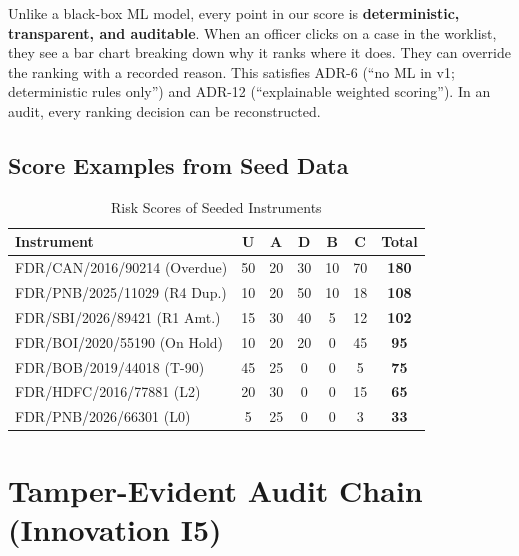 \documentclass[12pt, a4paper]{report}
\begin{document}
\begin{innovationbox}[title={Innovation I2: Why Explainability Matters}]
Unlike a black-box ML model, every point in our score is \textbf{deterministic, transparent, and auditable}. When an officer clicks on a case in the worklist, they see a bar chart breaking down why it ranks where it does. They can override the ranking with a recorded reason. This satisfies ADR-6 (``no ML in v1; deterministic rules only'') and ADR-12 (``explainable weighted scoring''). In an audit, every ranking decision can be reconstructed.
\end{innovationbox}

\section{Score Examples from Seed Data}

\begin{table}[H]
\centering
\caption{Risk Scores of Seeded Instruments}
\begin{tabular}{|l|c|c|c|c|c|c|}
\hline
\textbf{Instrument} & \textbf{U} & \textbf{A} & \textbf{D} & \textbf{B} & \textbf{C} & \textbf{Total} \\
\hline
FDR/CAN/2016/90214 (Overdue) & 50 & 20 & 30 & 10 & 70 & \textbf{180} \\
FDR/PNB/2025/11029 (R4 Dup.) & 10 & 20 & 50 & 10 & 18 & \textbf{108} \\
FDR/SBI/2026/89421 (R1 Amt.) & 15 & 30 & 40 & 5 & 12 & \textbf{102} \\
FDR/BOI/2020/55190 (On Hold) & 10 & 20 & 20 & 0 & 45 & \textbf{95} \\
FDR/BOB/2019/44018 (T-90) & 45 & 25 & 0 & 0 & 5 & \textbf{75} \\
FDR/HDFC/2016/77881 (L2) & 20 & 30 & 0 & 0 & 15 & \textbf{65} \\
FDR/PNB/2026/66301 (L0) & 5 & 25 & 0 & 0 & 3 & \textbf{33} \\
\hline
\end{tabular}
\end{table}


\chapter{Tamper-Evident Audit Chain (Innovation I5)}
\end{document}
